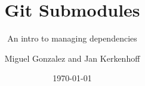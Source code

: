 
\usepackage{booktabs}
\usepackage{graphicx}
\usepackage[scale=2]{ccicons}
\usepackage{pgfplots}

\title{Git Submodules}
\subtitle{An intro to managing dependencies}
\date{\today}
\author{Miguel Gonzalez and Jan Kerkenhoff}
